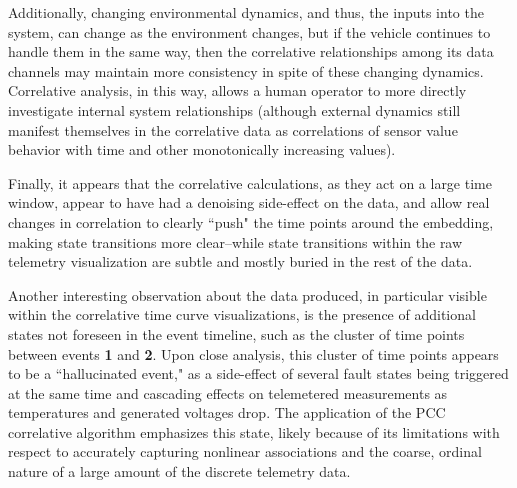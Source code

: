 Additionally, changing environmental dynamics, and thus, the inputs into the system, can change as the environment changes, but if the vehicle continues to handle them in the same way, then the correlative relationships among its data channels may maintain more consistency in spite of these changing dynamics. Correlative analysis, in this way, allows a human operator to more directly investigate internal system relationships (although external dynamics still manifest themselves in the correlative data as correlations of sensor value behavior with time and other monotonically increasing values).

Finally, it appears that the correlative calculations, as they act on a large time window, appear to have had a denoising side-effect on the data, and allow real changes in correlation to clearly ``push" the time points around the embedding, making state transitions more clear--while state transitions within the raw telemetry visualization are subtle and mostly buried in the rest of the data.

Another interesting observation about the data produced, in particular visible within the correlative time curve visualizations, is the presence of additional states not foreseen in the event timeline, such as the cluster of time points between events \textbf{1} and \textbf{2}. Upon close analysis, this cluster of time points appears to be a ``hallucinated event," as a side-effect of several fault states being triggered at the same time and cascading effects on telemetered measurements as temperatures and generated voltages drop. The application of the PCC correlative algorithm emphasizes this state, likely because of its limitations with respect to accurately capturing nonlinear associations and the coarse, ordinal nature of a large amount of the discrete telemetry data.

